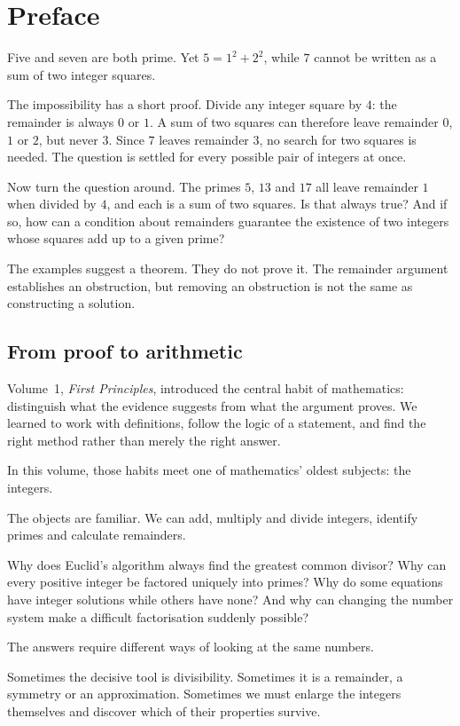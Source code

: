 \chapter*{Preface}

Five and seven are both prime. Yet $5=1^2+2^2$, while $7$ cannot be written as a sum of two integer squares.

The impossibility has a short proof. Divide any integer square by $4$: the remainder is always $0$ or $1$. A sum of two squares can therefore leave remainder $0$, $1$ or $2$, but never $3$. Since $7$ leaves remainder $3$, no search for two squares is needed. The question is settled for every possible pair of integers at once.

Now turn the question around. The primes $5$, $13$ and $17$ all leave remainder $1$ when divided by $4$, and each is a sum of two squares. Is that always true? And if so, how can a condition about remainders guarantee the existence of two integers whose squares add up to a given prime?

The examples suggest a theorem. They do not prove it. The remainder argument establishes an obstruction, but removing an obstruction is not the same as constructing a solution.

\section*{From proof to arithmetic}

Volume~1, \emph{First Principles}, introduced the central habit of mathematics: distinguish what the evidence suggests from what the argument proves. We learned to work with definitions, follow the logic of a statement, and find the right method rather than merely the right answer.

In this volume, those habits meet one of mathematics' oldest subjects: the integers.

The objects are familiar. We can add, multiply and divide integers, identify primes and calculate remainders.

Why does Euclid's algorithm always find the greatest common divisor? Why can every positive integer be factored uniquely into primes? Why do some equations have integer solutions while others have none? And why can changing the number system make a difficult factorisation suddenly possible?

The answers require different ways of looking at the same numbers.

Sometimes the decisive tool is divisibility. Sometimes it is a remainder, a symmetry or an approximation. Sometimes we must enlarge the integers themselves and discover which of their properties survive.


